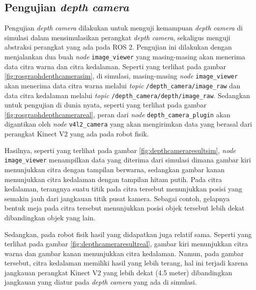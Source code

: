 \subsection{Pengujian \emph{depth camera}}
\label{subsec:depthcameratesting}




Pengujian \emph{depth camera} dilakukan untuk menguji kemampuan \emph{depth camera} di simulasi dalam mensimulasikan perangkat \emph{depth camera},
  sekaligus menguji abstraksi perangkat yang ada pada ROS 2.
Pengujian ini dilakukan dengan menjalankan dua buah \emph{node} \lstinline{image_viewer} yang masing-masing akan menerima data citra warna dan citra kedalaman.
Seperti yang terlihat pada gambar \ref{fig:rosgraphdepthcamerasim},
  di simulasi,
  masing-masing \emph{node} \lstinline{image_viewer} akan menerima data citra warna melalui \emph{topic} \lstinline{/depth_camera/image_raw} dan data citra kedalaman melalui \emph{topic} \lstinline{/depth_camera/depth/image_raw}.
Sedangkan untuk pengujian di dunia nyata,
  seperti yang terlihat pada gambar \ref{fig:rosgraphdepthcamerareal},
  peran dari \emph{node} \lstinline{depth_camera_plugin} akan digantikan oleh \emph{node} \lstinline{v4l2_camera} yang akan mengirimkan data yang berasal dari perangkat Kinect V2 yang ada pada robot fisik.



Hasilnya,
  seperti yang terlihat pada gambar \ref{fig:depthcameraresultsim},
  \emph{node} \lstinline{image_viewer} menampilkan data yang diterima dari simulasi dimana gambar kiri menunjukkan citra dengan tampilan berwarna,
  sedangkan gambar kanan menunjukkan citra kedalaman dengan tampilan hitam putih.
Pada citra kedalaman,
  terangnya suatu titik pada citra tersebut menunjukkan posisi yang semakin jauh dari jangkauan titik pusat kamera.
Sebagai contoh,
  gelapnya bentuk meja pada citra tersebut menunjukkan posisi objek tersebut lebih dekat dibandingkan objek yang lain.



Sedangkan,
  pada robot fisik hasil yang didapatkan juga relatif sama.
Seperti yang terlihat pada gambar \ref{fig:depthcameraresultreal},
  gambar kiri menunjukkan citra warna dan gambar kanan menunjukkan citra kedalaman.
Namun,
  pada gambar tersebut,
  citra kedalaman memiliki hasil yang lebih terang,
  hal ini terjadi karena jangkauan perangkat Kinect V2 yang lebih dekat (4.5 meter) dibandingkan jangkauan yang diatur pada \emph{depth camera} yang ada di simulasi.
